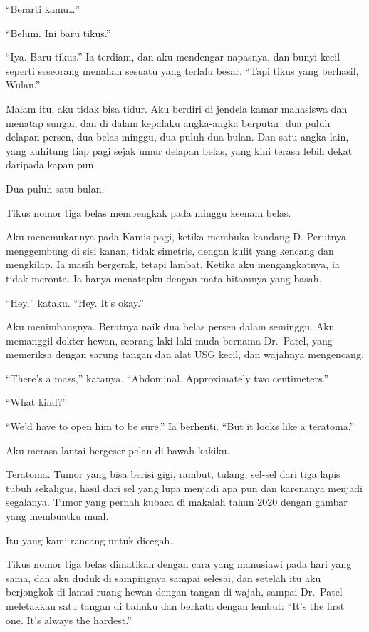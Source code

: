 \documentclass[11pt,twoside,openany]{book}
\makeatletter
\newcommand{\scenebreak}{\par\vspace{0.9em}{\centering\textsc{*\hspace{0.7em}*\hspace{0.7em}*}\par}\vspace{0.9em}\@afterindentfalse\@afterheading}
\makeatother
\begin{document}
``Berarti kamu\ldots{}''

``Belum. Ini baru tikus.''

``Iya. Baru tikus.'' Ia terdiam, dan aku mendengar napasnya, dan bunyi kecil seperti seseorang menahan sesuatu yang terlalu besar. ``Tapi tikus yang berhasil, Wulan.''

Malam itu, aku tidak bisa tidur. Aku berdiri di jendela kamar mahasiswa dan menatap sungai, dan di dalam kepalaku angka-angka berputar: dua puluh delapan persen, dua belas minggu, dua puluh dua bulan. Dan satu angka lain, yang kuhitung tiap pagi sejak umur delapan belas, yang kini terasa lebih dekat daripada kapan pun.

Dua puluh satu bulan.

\scenebreak
Tikus nomor tiga belas membengkak pada minggu keenam belas.

Aku menemukannya pada Kamis pagi, ketika membuka kandang D. Perutnya menggembung di sisi kanan, tidak simetris, dengan kulit yang kencang dan mengkilap. Ia masih bergerak, tetapi lambat. Ketika aku mengangkatnya, ia tidak meronta. Ia hanya menatapku dengan mata hitamnya yang basah.

``Hey,'' kataku. ``Hey. It's okay.''

Aku menimbangnya. Beratnya naik dua belas persen dalam seminggu. Aku memanggil dokter hewan, seorang laki-laki muda bernama Dr.~Patel, yang memeriksa dengan sarung tangan dan alat USG kecil, dan wajahnya mengencang.

``There's a mass,'' katanya. ``Abdominal. Approximately two centimeters.''

``What kind?''

``We'd have to open him to be sure.'' Ia berhenti. ``But it looks like a teratoma.''

Aku merasa lantai bergeser pelan di bawah kakiku.

Teratoma. Tumor yang bisa berisi gigi, rambut, tulang, sel-sel dari tiga lapis tubuh sekaligus, hasil dari sel yang lupa menjadi apa pun dan karenanya menjadi segalanya. Tumor yang pernah kubaca di makalah tahun 2020 dengan gambar yang membuatku mual.

Itu yang kami rancang untuk dicegah.

Tikus nomor tiga belas dimatikan dengan cara yang manusiawi pada hari yang sama, dan aku duduk di sampingnya sampai selesai, dan setelah itu aku berjongkok di lantai ruang hewan dengan tangan di wajah, sampai Dr.~Patel meletakkan satu tangan di bahuku dan berkata dengan lembut: ``It's the first one. It's always the hardest.''
\end{document}
